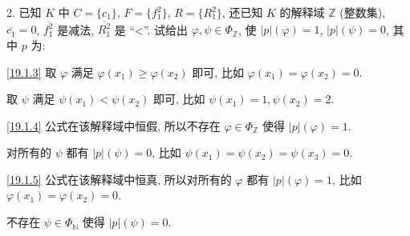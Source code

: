 \documentclass[boxes]{homework}
\begin{document}
\begin{problem}
2. 已知 $K$ 中 $C=\{c_1\}$, $F=\{f_1^2\}$, $R=\{R_1^2\}$, 还已知 $K$ 的解释域 $\mathbb{Z}$ (整数集), $\overline{c_1} = 0$, $\overline{f_1^2}$ 是减法, $\overline{R_1^2}$ 是 ``<''. 试给出 $\varphi, \psi\in\Phi_{\mathbb{Z}}$, 使 $\lvert p\rvert(\varphi) = 1$, $\lvert p\rvert(\psi) = 0$, 其中 $p$ 为:
\end{problem}
\begin{solution}
    \ref{19.1.3} 取 $\varphi$ 满足 $\varphi(x_1)\geq \varphi(x_2)$ 即可, 比如 $\varphi(x_1) = \varphi(x_2) = 0$.

    取 $\psi$ 满足 $\psi(x_1) < \psi(x_2)$ 即可, 比如 $\psi(x_1) = 1, \psi(x_2) = 2$.

    \ref{19.1.4} 公式在该解释域中恒假, 所以不存在 $\varphi\in\Phi_\mathbb{Z}$ 使得 $\lvert p\rvert(\varphi) = 1$.

    对所有的 $\psi$ 都有 $\lvert p\rvert(\psi) = 0$, 比如 $\psi(x_1) = \psi(x_2) = \psi(x_3) = 0$.

    \ref{19.1.5} 公式在该解释域中恒真, 所以对所有的 $\varphi$ 都有 $\lvert p\rvert(\varphi) = 1$, 比如 $\varphi(x_1) = \varphi(x_2) = 0$.

    不存在 $\psi\in\Phi_{\mathbb{N}}$ 使得 $\lvert p\rvert(\psi) = 0$.
\end{solution}
\end{document}
